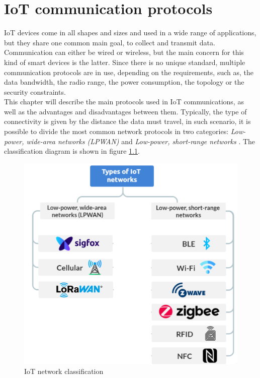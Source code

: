 \chapter{IoT communication protocols}

IoT devices come in all shapes and sizes and used in a wide range of applications, but they share one common main goal, to collect and transmit data. Communication can either be wired or wireless, but the main concern for this kind of smart devices is the latter. Since there is no unique standard, multiple communication protocols are in use, depending on the requirements, such as, the data bandwidth, the radio range, the power consumption, the  topology or the security constraints. \\

This chapter will describe the main protocols used in IoT communications, as well as the advantages and disadvantages between them. Typically, the type of connectivity is given by the distance the data must travel, in such scenario, it is possible to divide the most common network protocols in two categories: \textit{Low-power, wide-area networks (LPWAN)} and \textit{Low-power, short-range networks} \cite{Microsoft:protocols}. The classification diagram is shown in figure \ref{fig:NetworkClassification}.


\begin{figure}[h]
    \centering
    \includegraphics[width=.9\linewidth]{images/TypeOfNetworks.png}
    \caption{IoT network classification}
    \label{fig:NetworkClassification}
\end{figure}


